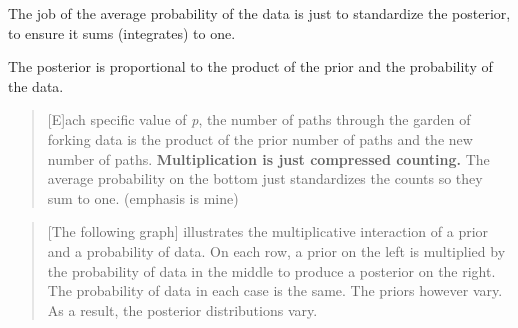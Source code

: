 \documentclass[
  letterpaper,
  DIV=11,
  numbers=noendperiod]{scrreprt}
\begin{document}
The job of the average probability of the data is just to standardize
the posterior, to ensure it sums (integrates) to one.

\begin{tcolorbox}[enhanced jigsaw, colframe=quarto-callout-important-color-frame, colback=white, toprule=.15mm, breakable, arc=.35mm, bottomtitle=1mm, colbacktitle=quarto-callout-important-color!10!white, toptitle=1mm, titlerule=0mm, title=\textcolor{quarto-callout-important-color}{\faExclamation}\hspace{0.5em}{Key lesson}, leftrule=.75mm, opacityback=0, rightrule=.15mm, opacitybacktitle=0.6, bottomrule=.15mm, left=2mm, coltitle=black]

The posterior is proportional to the product of the prior and the
probability of the data.

\end{tcolorbox}

\begin{quote}
{[}E{]}ach specific value of \emph{p}, the number of paths through the
garden of forking data is the product of the prior number of paths and
the new number of paths. \textbf{Multiplication is just compressed
counting.} The average probability on the bottom just standardizes the
counts so they sum to one. (emphasis is mine)
\end{quote}

\begin{quote}
{[}The following graph{]} illustrates the multiplicative interaction of
a prior and a probability of data. On each row, a prior on the left is
multiplied by the probability of data in the middle to produce a
posterior on the right. The probability of data in each case is the
same. The priors however vary. As a result, the posterior distributions
vary.
\end{quote}
\end{document}
